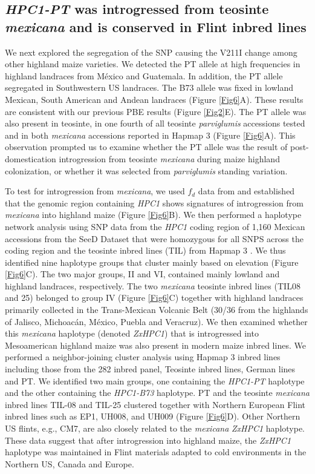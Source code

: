 \documentclass[9pt,twocolumn,twoside,lineno]{BioRxiv}
\begin{document}
\subsection{\textit{HPC1-PT} was introgressed from teosinte \textit{mexicana} and is conserved in Flint inbred lines} 
We next explored the segregation of the SNP causing the V211I change among other highland maize varieties.
We detected the PT allele at high frequencies in highland landraces from México and Guatemala. In addition, the PT allele segregated in Southwestern US landraces. 
The B73 allele was fixed in lowland Mexican, South American and Andean landraces (Figure \ref{Fig6}A). 
These results are consistent with our previous PBE results (Figure \ref{Fig2}E).
The PT allele was also present in teosinte, in one fourth of all teosinte \textit{parviglumis} accessions tested and in both \textit{mexicana} accessions reported in Hapmap 3 \cite{Bukowski2017-ng} (Figure \ref{Fig6}A). 
This observation prompted us to examine whether the PT allele was the result of post-domestication introgression from teosinte \textit{mexicana} during maize highland colonization, or whether it was selected from \textit{parviglumis} standing variation.

To test for introgression from \textit{mexicana}, we used \(f_d\) data from \cite{Gonzalez-Segovia2019-jy} and established that the genomic region containing \textit{HPC1} shows signatures of introgression from \textit{mexicana} into highland maize (Figure \ref{Fig6}B).
We then performed a haplotype network analysis using SNP data from the \textit{HPC1} coding region of 1,160 Mexican accessions from the SeeD Dataset \cite{Romero_Navarro2017-cn} that were homozygous for all SNPS across the coding region and the teosinte inbred lines (TIL) from Hapmap 3 \cite{Bukowski2017-ng}.   
We thus identified nine haplotype groups that cluster mainly based on elevation (Figure \ref{Fig6}C). 
The two major groups, II and VI, contained mainly lowland and highland landraces, respectively. 
The two \textit{mexicana} teosinte inbred lines (TIL08 and 25) belonged to group IV  (Figure \ref{Fig6}C) together with highland landraces primarily collected in the Trans-Mexican Volcanic Belt (30/36 from the highlands of Jalisco, Michoacán, México, Puebla and Veracruz).
We then examined whether this \textit{mexicana} haplotype (denoted \textit{ZxHPC1}) that is introgressed into Mesoamerican highland maize was also present in modern maize inbred lines. 
We performed a neighbor-joining cluster analysis using Hapmap 3 inbred lines including those from the 282 inbred panel, Teosinte inbred lines, German lines and PT. 
We identified two main groups, one containing the \textit{HPC1-PT} haplotype and the other containing the \textit{HPC1-B73} haplotype.
PT and the teosinte \textit{mexicana} inbred lines TIL-08 and TIL-25 clustered together with Northern European Flint inbred lines such as EP1, UH008, and UH009 (Figure \ref{Fig6}D). 
Other Northern US flints, e.g., CM7, are also closely related to the \textit{mexicana} \textit{ZxHPC1} haplotype. 
These data suggest that after introgression into highland maize, the \textit{ZxHPC1} haplotype was maintained in Flint materials adapted to cold environments in the Northern US, Canada and Europe. 
\end{document}
